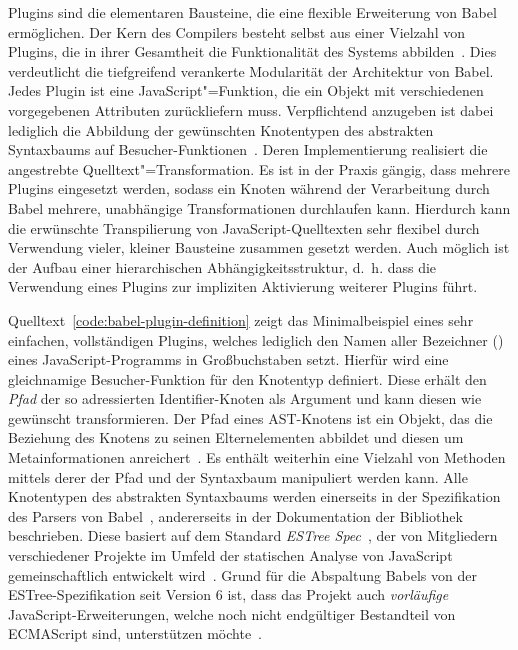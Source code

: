 Plugins sind die elementaren Bausteine, die eine flexible Erweiterung von Babel ermöglichen. Der Kern des Compilers besteht selbst aus einer Vielzahl von Plugins, die in ihrer Gesamtheit die Funktionalität des Systems abbilden~\autocite{BABEL}. Dies verdeutlicht die tiefgreifend verankerte Modularität der Architektur von Babel. Jedes Plugin ist eine JavaScript"=Funktion, die ein Objekt mit verschiedenen vorgegebenen Attributen zurückliefern muss. Verpflichtend anzugeben ist dabei lediglich die Abbildung der gewünschten Knotentypen des abstrakten Syntaxbaums auf Besucher-Funktionen~\autocite{BABEL:HANDBOOK}. Deren Implementierung realisiert die angestrebte Quelltext"=Transformation. Es ist in der Praxis gängig, dass mehrere Plugins eingesetzt werden, sodass ein Knoten während der Verarbeitung durch Babel mehrere, unabhängige Transformationen durchlaufen kann. Hierdurch kann die erwünschte Transpilierung von JavaScript-Quelltexten sehr flexibel durch Verwendung vieler, kleiner Bausteine zusammen gesetzt werden. Auch möglich ist der Aufbau einer hierarchischen Abhängigkeitsstruktur, d.~h. dass die Verwendung eines Plugins zur impliziten Aktivierung weiterer Plugins führt.

Quelltext~\ref{code:babel-plugin-definition} zeigt das Minimalbeispiel eines sehr einfachen, vollständigen Plugins, welches lediglich den Namen aller Bezeichner () eines JavaScript-Programms in Großbuchstaben setzt. Hierfür wird eine gleichnamige Besucher-Funktion für den Knotentyp  definiert. Diese erhält den \emph{Pfad} der so adressierten Identifier-Knoten als Argument und kann diesen wie gewünscht transformieren. Der Pfad eines AST-Knotens ist ein Objekt, das die Beziehung des Knotens zu seinen Elternelementen abbildet und diesen um Metainformationen anreichert~\autocite{BABEL:HANDBOOK}. Es enthält weiterhin eine Vielzahl von Methoden mittels derer der Pfad und der Syntaxbaum manipuliert werden kann.
Alle Knotentypen des abstrakten Syntaxbaums werden einerseits in der Spezifikation des Parsers von Babel~\autocite{BABEL:PARSER_SPEC,BABEL:PARSER}, andererseits in der Dokumentation der Bibliothek \autocite{BABEL:TYPES} beschrieben. Diese basiert auf dem Standard \textit{ESTree Spec}~\autocite{ESTREE_SPEC}, der von Mitgliedern verschiedener Projekte im Umfeld der statischen Analyse von JavaScript gemeinschaftlich entwickelt wird~\autocite{BABEL:PARSER,ESTREE_SPEC}. Grund für die Abspaltung Babels von der ESTree-Spezifikation seit Version 6 ist, dass das Projekt auch \emph{vorläufige} JavaScript-Erweiterungen, welche noch nicht endgültiger Bestandteil von ECMAScript sind, unterstützen möchte~\autocite{BABEL:STATE_OF_BABEL}.

